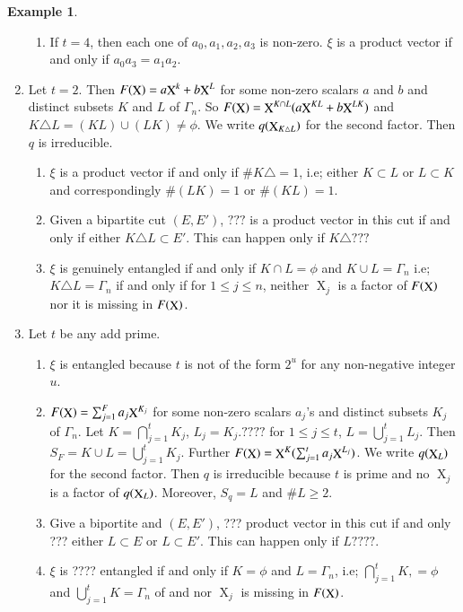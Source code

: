 \documentclass[a4paper,12pt]{article}
\DeclareMathOperator{\x}{\mathrm{X}}
\theoremstyle{definition}
\theoremstyle{underlinethm}
\newtheorem{example}{Example}[section]
\theoremstyle{definition}
\begin{document}
\begin{example}
\begin{enumerate}[label=(\roman*)]
\begin{enumerate}[label=(\alph*)]
 \item If $t =4$, then each one of $a_{0}, a_{1}, a_{2}, a_{3}$ is non-zero. $\xi$ is a product vector if and only if $a_{0}a_{3}= a_{1}a_{2}$.
   \end{enumerate}
 
 \item Let $t=2$. Then $F(\bold{\x}) = a \bold{\x}^{k} + b \bold{\x}^{L}$ for some non-zero scalars $a$ and $b$ and distinct subsets $K$ and $L$ of $\Gamma_{n}$. So $F(\bold{\x}) = \bold{\x}^{K \cap L} (a \bold{\x}^{K L} + b \bold{\x}^{L K})$ and $K \triangle L = (K  L) \cup  (L K) \neq \phi$. We write $q(\bold{\x}_{K \triangle L})$ for the second factor. Then $q$ is irreducible.
 
 \begin{enumerate}[label=(\alph*)]
 \item $\xi$ is a product vector if and only if $\# K \triangle = 1$, i.e; either $K \subset L$ or $L \subset K$ and correspondingly $\#(L K) = 1$ or $\# (K L) = 1$.
 \item Given a bipartite cut $(E,E')$, $???$ is a product vector in this cut if and only if either $K \triangle L \subset E'$. This can happen only if $K \triangle ???$
 \item $\xi$ is genuinely entangled if and only if $K \cap L = \phi$ and $K \cup L = \Gamma_{n}$ i.e; $K \triangle L = \Gamma_{n}$ if and only if for $1 \leq j \leq n$, neither $\x_{j}$ is a factor of $F(\bold{\x})$ nor it is missing in $F(\bold{\x})$. 
 \end{enumerate}
 
 \item Let $t$ be any add prime.
 
 \begin{enumerate}[label=(\alph*)]
 \item $\xi$ is entangled because $t$ is not of the form $2^{u}$ for any non-negative integer $u$.
 \item $F(\bold{\x}) = \sum_{j=1}^{F} a_{j}\bold{\x}^{K_{j}}$ for some non-zero scalars $a_{j}$'s and distinct subsets $K_{j}$ of $\Gamma_{n}$. Let $K =\bigcap\limits_{j=1}^{t} K_{j}$, $L_{j} = K_{j} . ????$ for $1 \leq j \leq t$, $L =\bigcup\limits_{j=1}^{t}L_{j}$. Then $S_{F} = K \cup L = \bigcup\limits_{j=1}^{t} K _{j}$. Further $F(\bold{\x}) = \bold{\x}^{K}(\sum_{j=1}^{t} a_{j}\bold{\x}^{L_{j}})$. We write $q(\bold{\x}_{L})$ for the second factor. Then $q$ is irreducible because $t$ is prime and no $\x_{j}$ is a factor of $q(\bold{\x}_{L})$. Moreover, $S_{q} = L$ and $\# L \geq 2$.
 \item Give a biportite  and $(E, E')$, ??? product vector in this cut if and only ??? either $L \subset E$ or $L \subset E'$. This can happen only if $L ????$.
 \item $\xi$ is ???? entangled if and only if $K = \phi$ and $L = \Gamma_{n}$, i.e; $\bigcap\limits_{j=1}^{t} K, = \phi$ and $\bigcup\limits_{j=1}^{t} K = \Gamma_{n}$ of and nor $\x_{j}$ is missing in $F(\bold{\x})$.
  \end{enumerate}
 

\end{enumerate}
\end{example}
\end{document}
